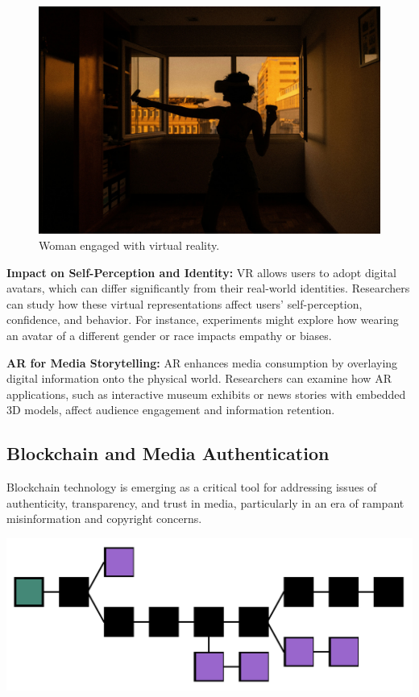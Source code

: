 \documentclass[
]{book}
\begin{document}
\begin{figure}
\centering
\includegraphics[width=1\linewidth,height=\textheight,keepaspectratio]{images/virtual-reality.jpg}
\caption{Woman engaged with virtual reality.}
\end{figure}

\textbf{Impact on Self-Perception and Identity:} VR allows users to adopt digital avatars, which can differ significantly from their real-world identities. Researchers can study how these virtual representations affect users' self-perception, confidence, and behavior. For instance, experiments might explore how wearing an avatar of a different gender or race impacts empathy or biases.

\textbf{AR for Media Storytelling:} AR enhances media consumption by overlaying digital information onto the physical world. Researchers can examine how AR applications, such as interactive museum exhibits or news stories with embedded 3D models, affect audience engagement and information retention.

\subsection*{Blockchain and Media Authentication}\label{blockchain-and-media-authentication}

Blockchain technology is emerging as a critical tool for addressing issues of authenticity, transparency, and trust in media, particularly in an era of rampant misinformation and copyright concerns.

\href{https://en.wikipedia.org/wiki/Blockchain}{\includegraphics[width=1\linewidth,height=\textheight,keepaspectratio]{images/blockchain.png}}
\end{document}
